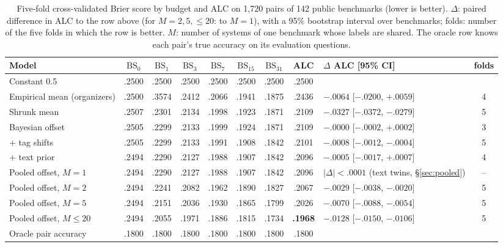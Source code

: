 \documentclass{article}
\begin{document}
\begin{table}[t]
  \caption{Five-fold cross-validated Brier score by budget and ALC on 1{,}720 pairs of 142 public benchmarks (lower is better). $\Delta$: paired difference in ALC to the row above (for $M = 2, 5, \le 20$: to $M = 1$), with a 95\% bootstrap interval over benchmarks; folds: number of the five folds in which the row is better. $M$: number of systems of one benchmark whose labels are shared. The oracle row knows each pair's true accuracy on its evaluation questions.}
  \label{tab:main}
  \centering
  \footnotesize
  \setlength{\tabcolsep}{3pt}
  \begin{tabular}{@{}lccccccc@{\hspace{5pt}}l@{\hspace{4pt}}c@{}}
    \toprule
    Model & $\mathrm{BS}_0$ & $\mathrm{BS}_1$ & $\mathrm{BS}_3$ & $\mathrm{BS}_7$ & $\mathrm{BS}_{15}$ & $\mathrm{BS}_{31}$ & ALC & $\Delta$ ALC [95\% CI] & folds \\
    \midrule
    Constant 0.5 & .2500 & .2500 & .2500 & .2500 & .2500 & .2500 & .2500 & & \\
    Empirical mean (organizers) & .2500 & .3574 & .2412 & .2066 & .1941 & .1875 & .2436 & $-.0064$ [$-.0200$, $+.0059$] & 4 \\
    Shrunk mean & .2507 & .2301 & .2134 & .1998 & .1923 & .1871 & .2109 & $-.0327$ [$-.0372$, $-.0279$] & 5 \\
    Bayesian offset & .2505 & .2299 & .2133 & .1999 & .1924 & .1871 & .2109 & $-.0000$ [$-.0002$, $+.0002$] & 3 \\
    \quad + tag shifts & .2505 & .2299 & .2133 & .1991 & .1908 & .1842 & .2101 & $-.0008$ [$-.0012$, $-.0004$] & 5 \\
    \quad + text prior & .2494 & .2290 & .2127 & .1988 & .1907 & .1842 & .2096 & $-.0005$ [$-.0017$, $+.0007$] & 4 \\
    \midrule
    Pooled offset, $M=1$ & .2494 & .2290 & .2127 & .1988 & .1907 & .1842 & .2096 & $|\Delta| < .0001$ (text twins, \S\ref{sec:pooled}) & -- \\
    Pooled offset, $M=2$ & .2494 & .2241 & .2082 & .1962 & .1890 & .1827 & .2067 & $-.0029$ [$-.0038$, $-.0020$] & 5 \\
    Pooled offset, $M=5$ & .2494 & .2151 & .2036 & .1930 & .1865 & .1799 & .2026 & $-.0070$ [$-.0088$, $-.0054$] & 5 \\
    Pooled offset, $M\le 20$ & .2494 & .2055 & .1971 & .1886 & .1815 & .1734 & \textbf{.1968} & $-.0128$ [$-.0150$, $-.0106$] & 5 \\
    \midrule
    Oracle pair accuracy & .1800 & .1800 & .1800 & .1800 & .1800 & .1800 & .1800 & & \\
    \bottomrule
  \end{tabular}
\end{table}
\end{document}
